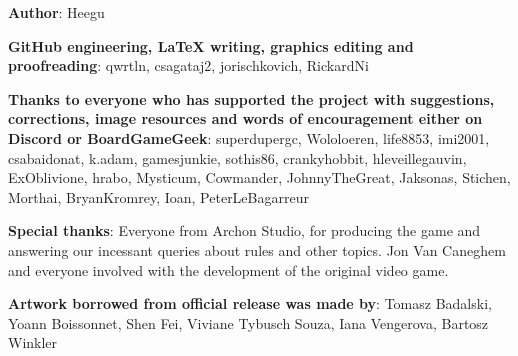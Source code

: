 
\bigbreak

\begin{multicols*}{2}

\textbf{Author}: Heegu\par
\textbf{GitHub engineering, LaTeX writing, graphics editing and proofreading}: qwrtln, csagataj2, jorischkovich, RickardNi\par
\textbf{Thanks to everyone who has supported the project with suggestions, corrections, image resources and words of encouragement either on Discord or BoardGameGeek}: superdupergc, Wololoeren, life8853, imi2001, csabaidonat, k.adam, gamesjunkie, sothis86, cranky\textunderscore hobbit, hleveillegauvin, ExOblivione, hrabo, Mysticum, Cowmander, JohnnyTheGreat, Jaksonas, Stichen, Morthai, BryanKromrey, Ioan, PeterLeBagarreur\par
\textbf{Special thanks}: Everyone from Archon Studio, for producing the game and answering our incessant queries about rules and other topics.
Jon Van Caneghem and everyone involved with the development of the original video game.\par
\textbf{Artwork borrowed from official release was made by}: Tomasz Badalski, Yoann Boissonnet, Shen Fei, Viviane Tybusch Souza, Iana Vengerova, Bartosz Winkler

\end{multicols*}
